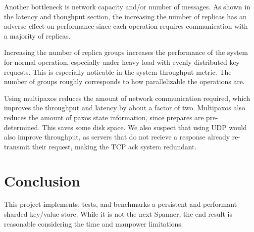 \documentclass[letterpaper,10pt]{article}
\begin{document}
Another bottleneck is network capacity and/or number of messages. As
shown in the latency and thoughput section, the increasing the number
of replicas has an adverse effect on performance since each operation
requires communication with a majority of replicas. 

Increasing the number of replica groups increases the performance of
the system for normal operation, especially under heavy load with
evenly distributed key requests. This is especially noticable in the
system throughput metric.  The number of groups roughly corresponds to
how parallelizable the operations are.

Using multipaxos reduces the amount of network communication required,
which improves the throughput and latency by about a factor of
two. Multipaxos also reduces the amount of paxos state information,
since prepares are pre-determined. This saves some disk space.  We
also suspect that using UDP would also improve throughput, as servers
that do not recieve a response already re-transmit their request,
making the TCP ack system redundant.

\section{Conclusion}
This project implements, tests, and benchmarks a persistent and
performant sharded key/value store. While it is not the next Spanner,
the end result is reasonable considering the time and manpower
limitations.

\end{document}
